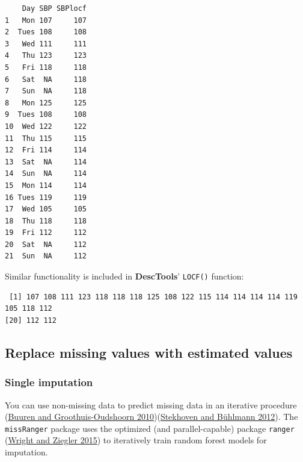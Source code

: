 \documentclass[
]{book}
\newenvironment{Shaded}{\begin{snugshade}}{\end{snugshade}}
\newcommand{\FunctionTok}[1]{\textcolor[rgb]{0.00,0.00,0.00}{#1}}
\newcommand{\NormalTok}[1]{#1}
\newcommand{\SpecialCharTok}[1]{\textcolor[rgb]{0.00,0.00,0.00}{#1}}
\begin{document}
\begin{verbatim}
    Day SBP SBPlocf
1   Mon 107     107
2  Tues 108     108
3   Wed 111     111
4   Thu 123     123
5   Fri 118     118
6   Sat  NA     118
7   Sun  NA     118
8   Mon 125     125
9  Tues 108     108
10  Wed 122     122
11  Thu 115     115
12  Fri 114     114
13  Sat  NA     114
14  Sun  NA     114
15  Mon 114     114
16 Tues 119     119
17  Wed 105     105
18  Thu 118     118
19  Fri 112     112
20  Sat  NA     112
21  Sun  NA     112
\end{verbatim}

Similar functionality is included in \textbf{DescTools}' \texttt{LOCF()} function:

\begin{Shaded}
\end{Shaded}

\begin{verbatim}
 [1] 107 108 111 123 118 118 118 125 108 122 115 114 114 114 114 119 105 118 112
[20] 112 112
\end{verbatim}

\hypertarget{replace-missing-values-with-estimated-values}{%
\subsection{Replace missing values with estimated values}\label{replace-missing-values-with-estimated-values}}

\hypertarget{single-imputation}{%
\subsubsection{Single imputation}\label{single-imputation}}

You can use non-missing data to predict missing data in an iterative procedure (\protect\hyperlink{ref-buuren2010mice}{Buuren and Groothuis-Oudshoorn 2010})(\protect\hyperlink{ref-stekhoven2012missforest}{Stekhoven and Bühlmann 2012}).
The \texttt{missRanger} package uses the optimized (and parallel-capable) package \texttt{ranger} (\protect\hyperlink{ref-wright2015ranger}{Wright and Ziegler 2015}) to iteratively train random forest models for imputation.
\end{document}
